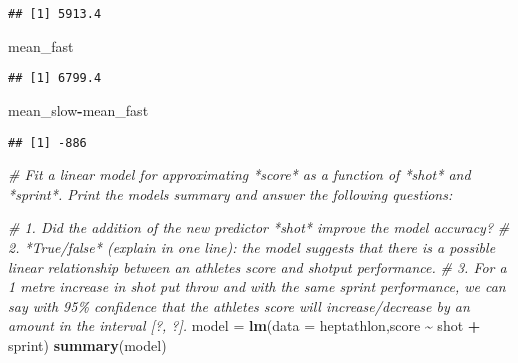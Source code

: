 \documentclass[
]{article}
\newenvironment{Shaded}{\begin{snugshade}}{\end{snugshade}}
\newcommand{\AttributeTok}[1]{\textcolor[rgb]{0.13,0.29,0.53}{#1}}
\newcommand{\CommentTok}[1]{\textcolor[rgb]{0.56,0.35,0.01}{\textit{#1}}}
\newcommand{\FunctionTok}[1]{\textcolor[rgb]{0.13,0.29,0.53}{\textbf{#1}}}
\newcommand{\NormalTok}[1]{#1}
\newcommand{\OtherTok}[1]{\textcolor[rgb]{0.56,0.35,0.01}{#1}}
\newcommand{\SpecialCharTok}[1]{\textcolor[rgb]{0.81,0.36,0.00}{\textbf{#1}}}
\newcommand{\StringTok}[1]{\textcolor[rgb]{0.31,0.60,0.02}{#1}}
\begin{document}
\begin{Shaded}
\end{Shaded}

\begin{verbatim}
## [1] 5913.4
\end{verbatim}

\begin{Shaded}
\begin{Highlighting}[]
\NormalTok{mean\_fast}
\end{Highlighting}
\end{Shaded}

\begin{verbatim}
## [1] 6799.4
\end{verbatim}

\begin{Shaded}
\begin{Highlighting}[]
\NormalTok{mean\_slow}\SpecialCharTok{{-}}\NormalTok{mean\_fast}
\end{Highlighting}
\end{Shaded}

\begin{verbatim}
## [1] -886
\end{verbatim}

\begin{Shaded}
\begin{Highlighting}[]
\CommentTok{\# Fit a linear model for approximating *score* as a function of *shot* and *sprint*. Print the model\textquotesingle{}s summary and answer the following questions:}

\CommentTok{\# 1. Did the addition of the new predictor *shot* improve the model accuracy? }
\CommentTok{\# 2. *True/false* (explain in one line): the model suggests that there is a possible linear relationship between an athlete\textquotesingle{}s score and shotput performance.}
\CommentTok{\# 3. For a 1 metre increase in shot put throw and with the same sprint performance, we can say with 95\% confidence that the athlete\textquotesingle{}s score will increase/decrease by an amount in the interval [?, ?].}
\NormalTok{model }\OtherTok{=} \FunctionTok{lm}\NormalTok{(}\AttributeTok{data =}\NormalTok{ heptathlon,score }\SpecialCharTok{\textasciitilde{}}\NormalTok{ shot }\SpecialCharTok{+}\NormalTok{ sprint)}
\FunctionTok{summary}\NormalTok{(model)}
\end{Highlighting}
\end{Shaded}
\end{document}
